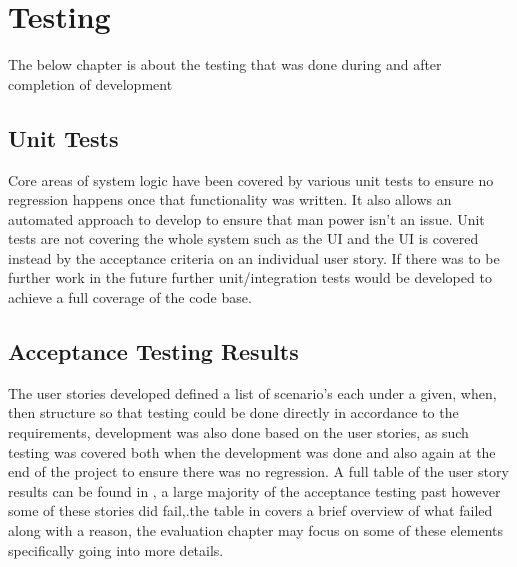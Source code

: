 \section{Testing}
The below chapter is about the testing that was done during and after completion of development

\subsection{Unit Tests}
Core areas of system logic have been covered by various unit tests to ensure no regression happens once that functionality was written. It also allows an automated approach to develop to ensure that man power isn't an issue. Unit tests are not covering the whole system such as the UI and the UI is covered instead by the acceptance criteria on an individual user story. If there was to be further work in the future further unit/integration tests would be developed to achieve a full coverage of the code base.

\subsection{Acceptance Testing Results}
The user stories developed defined a list of scenario's each under a given, when, then structure so that testing could be done directly in accordance to the requirements, development was also done based on the user stories, as such testing was covered both when the development was done and also again at the end of the project to ensure there was no regression. A full table of the user story results can be found in \appendixtemp, a large majority of the acceptance testing past however some of these stories did fail,.the table in \appendixtemp covers a brief overview of what failed along with a reason, the evaluation chapter may focus on some of these elements specifically going into more details.